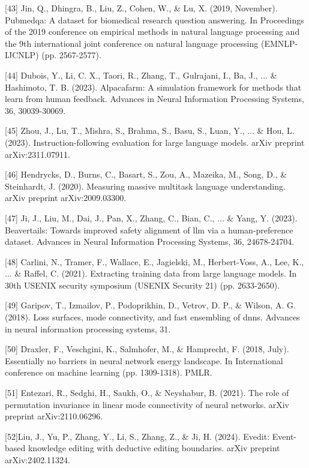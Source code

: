 [43] Jin, Q., Dhingra, B., Liu, Z., Cohen, W., \& Lu, X. (2019, November). Pubmedqa: A dataset for biomedical research question answering. In Proceedings of the 2019 conference on empirical methods in natural language processing and the 9th international joint conference on natural language processing (EMNLP-IJCNLP) (pp. 2567-2577).

[44] Dubois, Y., Li, C. X., Taori, R., Zhang, T., Gulrajani, I., Ba, J., ... \& Hashimoto, T. B. (2023). Alpacafarm: A simulation framework for methods that learn from human feedback. Advances in Neural Information Processing Systems, 36, 30039-30069.

[45] Zhou, J., Lu, T., Mishra, S., Brahma, S., Basu, S., Luan, Y., ... \& Hou, L. (2023). Instruction-following evaluation for large language models. arXiv preprint arXiv:2311.07911.

[46] Hendrycks, D., Burns, C., Basart, S., Zou, A., Mazeika, M., Song, D., \& Steinhardt, J. (2020). Measuring massive multitask language understanding. arXiv preprint arXiv:2009.03300.

[47] Ji, J., Liu, M., Dai, J., Pan, X., Zhang, C., Bian, C., ... \& Yang, Y. (2023). Beavertails: Towards improved safety alignment of llm via a human-preference dataset. Advances in Neural Information Processing Systems, 36, 24678-24704.

[48] Carlini, N., Tramer, F., Wallace, E., Jagielski, M., Herbert-Voss, A., Lee, K., ... \& Raffel, C. (2021). Extracting training data from large language models. In 30th USENIX security symposium (USENIX Security 21) (pp. 2633-2650).

[49] Garipov, T., Izmailov, P., Podoprikhin, D., Vetrov, D. P., \& Wilson, A. G. (2018). Loss surfaces, mode connectivity, and fast ensembling of dnns. Advances in neural information processing systems, 31.

[50] Draxler, F., Veschgini, K., Salmhofer, M., \& Hamprecht, F. (2018, July). Essentially no barriers in neural network energy landscape. In International conference on machine learning (pp. 1309-1318). PMLR.

[51] Entezari, R., Sedghi, H., Saukh, O., \& Neyshabur, B. (2021). The role of permutation invariance in linear mode connectivity of neural networks. arXiv preprint arXiv:2110.06296.

[52]Liu, J., Yu, P., Zhang, Y., Li, S., Zhang, Z., \& Ji, H. (2024). Evedit: Event-based knowledge editing with deductive editing boundaries. arXiv preprint arXiv:2402.11324.

